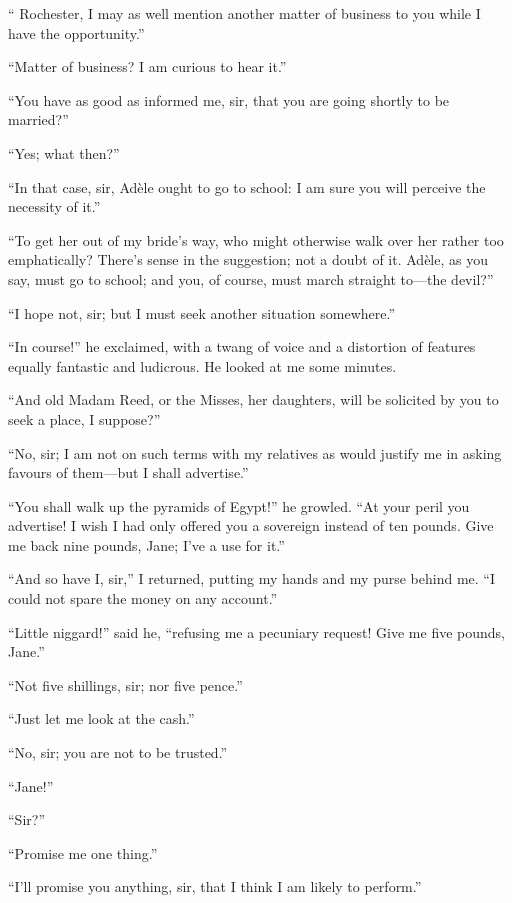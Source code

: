 \enquote{\Mr{} Rochester, I may as well mention another matter of business
	to you while I have the opportunity.}

\enquote{Matter of business? I am curious to hear it.}

\enquote{You have as good as informed me, sir, that you are going
	shortly to be married?}

\enquote{Yes; what then?}

\enquote{In that case, sir, Adèle ought to go to school: I am sure you
	will perceive the necessity of it.}

\enquote{To get her out of my bride's way, who might otherwise walk over
	her rather too emphatically? There's sense in the suggestion; not a
	doubt of it. Adèle, as you say, must go to school; and you, of course,
	must march straight to---the devil?}

\enquote{I hope not, sir; but I must seek another situation somewhere.}

\enquote{In course!} he exclaimed, with a twang of voice and a
distortion of features equally fantastic and ludicrous. He looked at me
some minutes.

\enquote{And old Madam Reed, or the Misses, her daughters, will be
	solicited by you to seek a place, I suppose?}

\enquote{No, sir; I am not on such terms with my relatives as would
	justify me in asking favours of them---but I shall advertise.}

\enquote{You shall walk up the pyramids of Egypt!} he growled.
\enquote{At your peril you advertise! I wish I had only offered you a
	sovereign instead of ten pounds. Give me back nine pounds, Jane; I've a
	use for it.}

\enquote{And so have I, sir,} I returned, putting my hands and my purse
behind me. \enquote{I could not spare the money on any account.}

\enquote{Little niggard!} said he, \enquote{refusing me a pecuniary
	request! Give me five pounds, Jane.}

\enquote{Not five shillings, sir; nor five pence.}

\enquote{Just let me look at the cash.}

\enquote{No, sir; you are not to be trusted.}

\enquote{Jane!}

\enquote{Sir?}

\enquote{Promise me one thing.}

\enquote{I'll promise you anything, sir, that I think I am likely to
	perform.}

